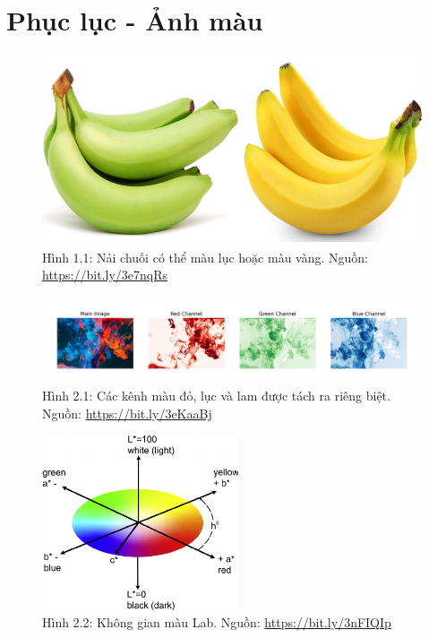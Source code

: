 \documentclass[a4paper]{article}
\begin{document}
\clearpage

\section{Phục lục - Ảnh màu}
\begin{figure}[h!]
\centering
\includegraphics[width=15cm]{images/1_1.jpg}
\caption*{Hình 1.1: Nải chuối có thể màu lục hoặc màu vàng. Nguồn: \href{https://bit.ly/3e7nqRs}{https://bit.ly/3e7nqRs}}
\end{figure}

\begin{figure}[h!]
\centering
\includegraphics[width=16.1cm]{images/2_1.jpeg}
\caption*{Hình 2.1: Các kênh màu đỏ, lục và lam được tách ra riêng biệt. Nguồn: \href{https://bit.ly/3eKaaBj}{https://bit.ly/3eKaaBj}}
\end{figure}

\begin{figure}[h!]
\centering
\includegraphics[width=5.8cm]{images/2_2.png}
\caption*{Hình 2.2: Không gian màu Lab. Nguồn: \href{https://bit.ly/3nFIQIp}{https://bit.ly/3nFIQIp}}
\end{figure}
\end{document}
